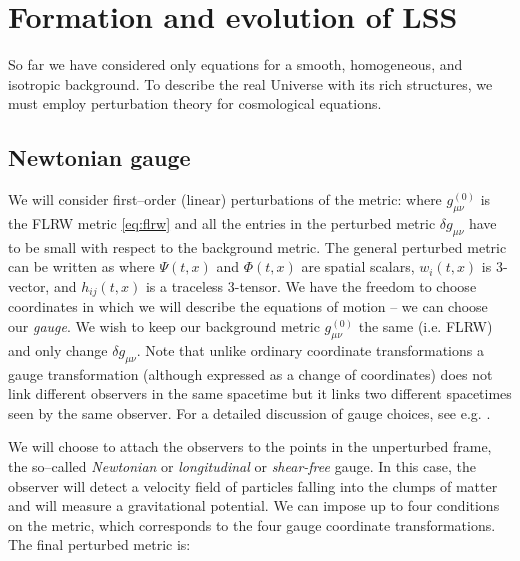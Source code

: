 \section{Formation and evolution of LSS}
So far we have considered only equations for a smooth, homogeneous, and isotropic background. To describe the real Universe with its rich structures, we must employ perturbation theory for cosmological equations.
\subsection{Newtonian gauge}
We will consider first--order (linear) perturbations of the metric:
where $g_{\mu\nu}^{(0)}$ is the FLRW metric \eqref{eq:flrw} and all the entries in the perturbed metric $\delta g_{\mu\nu}$ have to be small with respect to the background metric. The general perturbed metric can be written as
where $\Psi(t,x)$ and $\Phi(t,x)$ are spatial scalars, $w_i(t,x)$ is 3-vector, and $h_{ij}(t,x)$ is a traceless 3-tensor. We have the freedom to choose coordinates in which we will describe the equations of motion -- we can choose our \textit{gauge}. We wish to keep our background metric $g_{\mu\nu}^{(0)}$ the same (i.e. FLRW) and only change $\delta g_{\mu\nu}$. Note that unlike ordinary coordinate transformations a gauge transformation (although expressed as a change of coordinates) does not link different observers in the same spacetime but it links two different spacetimes seen by the same observer. For a detailed discussion of gauge choices, see e.g. \textcite{PhysRevD.40.1804,10.1143/PTPS.78.1,PhysRevD.22.1882}.

We will choose to attach the observers to the points in the unperturbed frame, the so--called \textit{Newtonian} or \textit{longitudinal} or \textit{shear-free} gauge. In this case, the observer will detect a velocity field of particles falling into the clumps of matter and will measure a gravitational potential. We can impose up to four conditions on the metric, which corresponds to the four gauge coordinate transformations. The final perturbed metric is:
